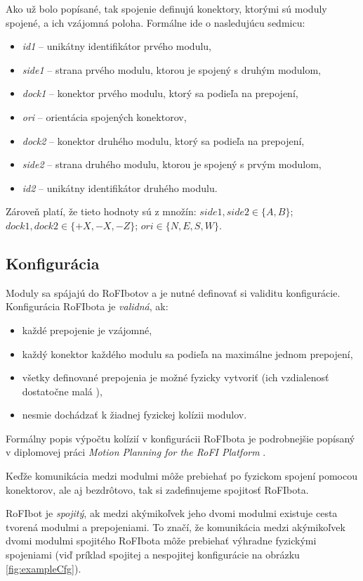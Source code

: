 \documentclass[
  digital, %
  oneside, %
  table,   %
  lof,     %
  nolot,     %
]{fithesis3}
\begin{document}
Ako už bolo popísané, tak spojenie definujú konektory, ktorými sú moduly spojené, a ich vzájomná poloha. Formálne ide o nasledujúcu sedmicu: 
\begin{itemize}
    \item \textit{id1} -- unikátny identifikátor prvého modulu, 
    \item \textit{side1} -- strana prvého modulu, ktorou je spojený s druhým modulom, 
    \item \textit{dock1} -- konektor prvého modulu, ktorý sa podieľa na prepojení,
    \item \textit{ori} -- orientácia spojených konektorov,
    \item \textit{dock2} -- konektor druhého modulu, ktorý sa podieľa na prepojení,
    \item \textit{side2} -- strana druhého modulu, ktorou je spojený s prvým modulom, 
    \item \textit{id2} -- unikátny identifikátor druhého modulu. 
\end{itemize}
Zároveň platí, že tieto hodnoty sú z množín: $side1, side2 \in \{A, B\}$; $dock1, dock2 \in \{+X, -X, -Z\}$; $ori \in \{N, E, S, W\}$.

\subsection{Konfigurácia}
\label{sec:formalSpecCfg}
Moduly sa spájajú do RoFIbotov a je nutné definovať si validitu konfigurácie. Konfigurácia RoFIbota je \textit{validná}, ak: 
\begin{itemize}
    \item každé prepojenie je vzájomné,
    \item každý konektor každého modulu sa podieľa na maximálne jednom prepojení, 
    \item všetky definované prepojenia je možné fyzicky vytvoriť (ich vzdialenosť dostatočne malá \cite{rofiCom}), 
    \item nesmie dochádzať k žiadnej fyzickej kolízii modulov. 
\end{itemize}
Formálny popis výpočtu kolízií v konfigurácii RoFIbota je podrobnejšie popísaný v diplomovej práci \textit{Motion Planning for the RoFI Platform} \cite{vozarovaMasterThesis}. 

Keďže komunikácia medzi modulmi môže prebiehať po fyzickom spojení pomocou konektorov, ale aj bezdrôtovo, tak si zadefinujeme spojitosť RoFIbota. 

RoFIbot je \textit{spojitý}, ak medzi akýmikoľvek jeho dvomi modulmi existuje cesta tvorená modulmi a prepojeniami. To značí, že komunikácia medzi akýmikoľvek dvomi modulmi spojitého RoFIbota môže prebiehať výhradne fyzickými spojeniami (viď príklad spojitej a nespojitej konfigurácie na obrázku \ref{fig:exampleCfg}). 
\end{document}

